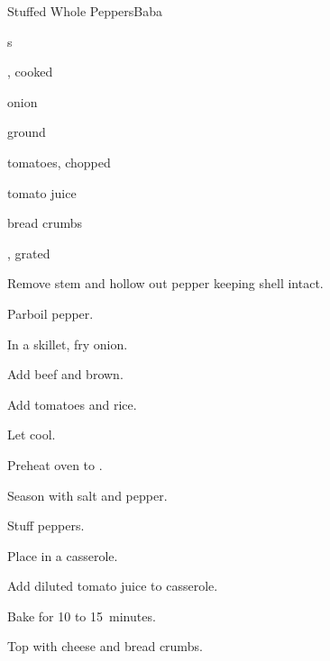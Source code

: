 \begin{recipe}{Stuffed Whole Peppers}{Baba}{}

\begin{ingredients}
\item {}s
\item {}, cooked
\item onion
\item ground 
\item tomatoes, chopped
\item tomato juice
\item bread crumbs
\item {}, grated
\end{ingredients}

\begin{directions}
\item Remove stem and hollow out pepper keeping shell intact.
\item Parboil pepper.
\item In a skillet, fry onion.
\item Add beef and brown.
\item Add tomatoes and rice.
\item Let cool.
\item Preheat oven to .
\item Season with salt and pepper.
\item Stuff peppers.
\item Place in a casserole.
\item Add diluted tomato juice to casserole.
\item Bake for 10 to 15~minutes.
\item Top with cheese and bread crumbs.
\end{directions}

\end{recipe}
